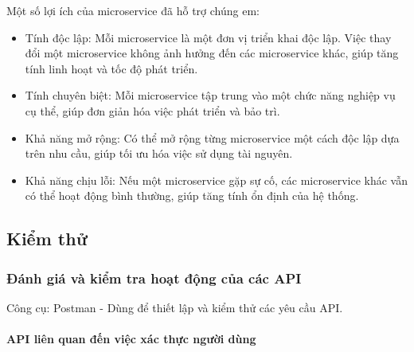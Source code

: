 Một số lợi ích của microservice đã hỗ trợ chúng em:
\begin{itemize}
	\item Tính độc lập: Mỗi microservice là một đơn vị triển khai độc lập. Việc thay đổi một microservice không ảnh hưởng đến các microservice khác, giúp tăng tính linh hoạt và tốc độ phát triển.
	\item Tính chuyên biệt: Mỗi microservice tập trung vào một chức năng nghiệp vụ cụ thể, giúp đơn giản hóa việc phát triển và bảo trì.
	\item Khả năng mở rộng: Có thể mở rộng từng microservice một cách độc lập dựa trên nhu cầu, giúp tối ưu hóa việc sử dụng tài nguyên.
	\item Khả năng chịu lỗi: Nếu một microservice gặp sự cố, các microservice khác vẫn có thể hoạt động bình thường, giúp tăng tính ổn định của hệ thống.
\end{itemize}

\subsection{Kiểm thử}

\subsubsection{Đánh giá và kiểm tra hoạt động của các API}




Công cụ: Postman - Dùng để thiết lập và kiểm thử các yêu cầu API.

\paragraph{API liên quan đến việc xác thực người dùng}
\mbox{}




